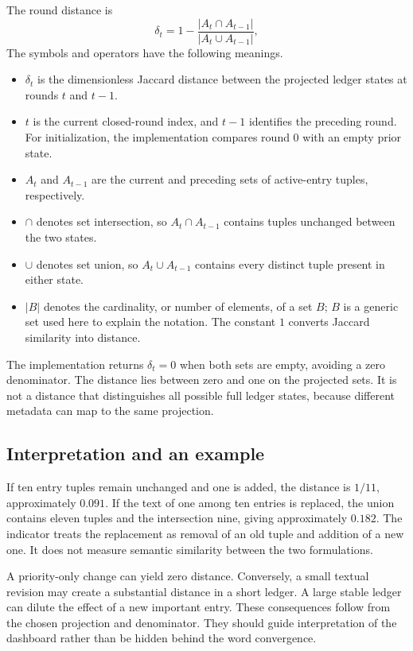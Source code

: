 \documentclass[12pt,a4paper]{article}
\begin{document}
The round distance is
\begin{equation}
 \delta_t=1-\frac{|A_t\cap A_{t-1}|}{|A_t\cup A_{t-1}|},
\end{equation}
The symbols and operators have the following meanings.
\begin{itemize}
\item $\delta_t$ is the dimensionless Jaccard distance between the projected ledger states at rounds $t$ and $t-1$.
\item $t$ is the current closed-round index, and $t-1$ identifies the preceding round. For initialization, the implementation compares round $0$ with an empty prior state.
\item $A_t$ and $A_{t-1}$ are the current and preceding sets of active-entry tuples, respectively.
\item $\cap$ denotes set intersection, so $A_t\cap A_{t-1}$ contains tuples unchanged between the two states.
\item $\cup$ denotes set union, so $A_t\cup A_{t-1}$ contains every distinct tuple present in either state.
\item $|B|$ denotes the cardinality, or number of elements, of a set $B$; $B$ is a generic set used here to explain the notation. The constant $1$ converts Jaccard similarity into distance.
\end{itemize}
The implementation returns $\delta_t=0$ when both sets are empty, avoiding a zero denominator. The distance lies between zero and one on the projected sets. It is not a distance that distinguishes all possible full ledger states, because different metadata can map to the same projection.

\subsection{Interpretation and an example}
If ten entry tuples remain unchanged and one is added, the distance is $1/11$, approximately $0.091$. If the text of one among ten entries is replaced, the union contains eleven tuples and the intersection nine, giving approximately $0.182$. The indicator treats the replacement as removal of an old tuple and addition of a new one. It does not measure semantic similarity between the two formulations.

A priority-only change can yield zero distance. Conversely, a small textual revision may create a substantial distance in a short ledger. A large stable ledger can dilute the effect of a new important entry. These consequences follow from the chosen projection and denominator. They should guide interpretation of the dashboard rather than be hidden behind the word convergence.
\end{document}
